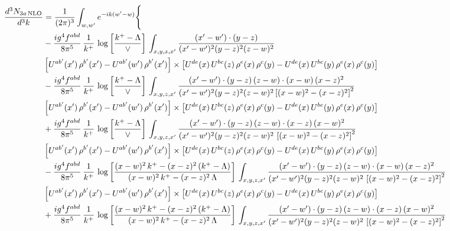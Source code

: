 \documentclass[9pt]{article}
\numberwithin{equation}{section}
\begin{document}
\begin{align}
\frac{d^{3}N_{3a\,\rm NLO}}{d^{3}k} & =\frac{1}{(2\pi)^{3}}\int_{w,w'}e^{-ik(w'-w)}\Bigg\{\notag \\ &  -\frac{ig^{4}f^{abd}}{8\pi^{5}}\,\frac{1}{k^{+}}\, \log{\left[\frac{k^{+}-\Lambda}{\vee}\right]}\,\int_{x,y,z,x'}
\frac{(x'-w')\cdot(y-z)}{(x'-w')^{2}(y-z)^{2}(z-w)^{2}}\notag \\ & \left[U^{ab'}(x')\,\rho^{b'}(x')-U^{ab'}(w')\, \rho^{b'}(x')\right]\times \left[U^{de}(x)\,U^{bc}(z)\, \rho^{e}(x)\,\rho^{c}(y)-U^{de}(x)\,U^{bc}(y)\,\rho^{e}(x)\,\rho^{c}(y)\right]\notag \\ & -\frac{ig^{4}f^{abd}}{8\pi^{5}}\,\frac{1}{k^{+}}\, \log{\left[\frac{k^{+}-\Lambda}{\vee}\right]}\,\int_{x,y,z,x'}
\frac{(x'-w')\cdot(y-z)\,(z-w)\cdot(x-w)\,(x-z)^{2}}{(x'-w')^{2}(y-z)^{2}(z-w)^{2}\left[(x-w)^{2}-(x-z)^{2}\right]^{2}}\notag \\ & \left[U^{ab'}(x')\,\rho^{b'}(x')-U^{ab'}(w')\, \rho^{b'}(x')\right]\times \left[U^{de}(x)\,U^{bc}(z)\, \rho^{e}(x)\,\rho^{c}(y)-U^{de}(x)\,U^{bc}(y)\,\rho^{e}(x)\,\rho^{c}(y)\right]\notag \\ & +\frac{ig^{4}f^{abd}}{8\pi^{5}}\,\frac{1}{k^{+}}\, \log{\left[\frac{k^{+}-\Lambda}{\vee}\right]}\,\int_{x,y,z,x'}
\frac{(x'-w')\cdot(y-z)\,(z-w)\cdot(x-z)\,(x-w)^{2}}{(x'-w')^{2}(y-z)^{2}(z-w)^{2}\,\left[(x-w)^{2}-(x-z)^{2}\right]^{2}}\notag \\ & \left[U^{ab'}(x')\,\rho^{b'}(x')-U^{ab'}(w')\, \rho^{b'}(x')\right]\times \left[U^{de}(x)\,U^{bc}(z)\, \rho^{e}(x)\,\rho^{c}(y)-U^{de}(x)\,U^{bc}(y)\,\rho^{e}(x)\,\rho^{c}(y)\right]\notag \\ & 
-\frac{ig^{4}f^{abd}}{8\pi^{5}}\,\frac{1}{k^{+}}\,\log{\left[\frac{(x-w)^{2}\,k^{+}-(x-z)^{2}\,(k^{+}-\Lambda)}{(x-w)^{2}\,k^{+}-(x-z)^{2}\,\Lambda}\right]}\,\int_{x,y,z,x'}
\frac{(x'-w')\cdot(y-z)\,(z-w)\cdot(x-w)\,(x-z)^{2}}{(x'-w')^{2}(y-z)^{2}(z-w)^{2}\,\left[(x-w)^{2}-(x-z)^{2}\right]^{2}}\notag \\ & \left[U^{ab'}(x')\,\rho^{b'}(x')-U^{ab'}(w')\, \rho^{b'}(x')\right]\times \left[U^{de}(x)\,U^{bc}(z)\, \rho^{e}(x)\,\rho^{c}(y)-U^{de}(x)\,U^{bc}(y)\,\rho^{e}(x)\,\rho^{c}(y)\right]\notag \\ & +\frac{ig^{4}f^{abd}}{8\pi^{5}}\,\frac{1}{k^{+}}\,\log{\left[\frac{(x-w)^{2}\,k^{+}-(x-z)^{2}\,(k^{+}-\Lambda)}{(x-w)^{2}\,k^{+}-(x-z)^{2}\,\Lambda}\right]}\,\int_{x,y,z,x'}
\frac{(x'-w')\cdot(y-z)\,(z-w)\cdot(x-z)\,(x-w)^{2}}{(x'-w')^{2}(y-z)^{2}(z-w)^{2}\,\left[(x-w)^{2}-(x-z)^{2}\right]^{2}}\notag \\ 

\end{align}
\end{document}
